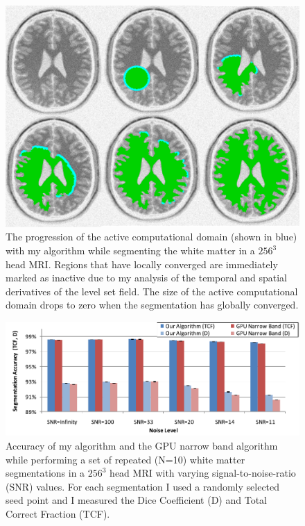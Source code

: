 \begin{figure}[t]
\centering
\includegraphics[width=6.0in]{figures/Brainweb-2D-Composite-2-3.png}
\caption{The progression of the active computational domain (shown in blue) with my algorithm while segmenting the white matter in a $256^3$ head MRI. Regions that have locally converged are immediately marked as inactive due to my analysis of the temporal and spatial derivatives of the level set field. The size of the active computational domain drops to zero when the segmentation has globally converged.}
\label{fig:brainweb2d}
\end{figure}
\begin{figure}[t]
\centering
\includegraphics[width=6.0in]{figures/Accuracy.pdf}
\caption{Accuracy of my algorithm and the GPU narrow band algorithm while performing a set of repeated (N=10) white matter segmentations in a $256^3$ head MRI with varying signal-to-noise-ratio (SNR) values. For each segmentation I used a randomly selected seed point and I measured the Dice Coefficient (D) and Total Correct Fraction (TCF).}
\label{fig:8}
\end{figure}

